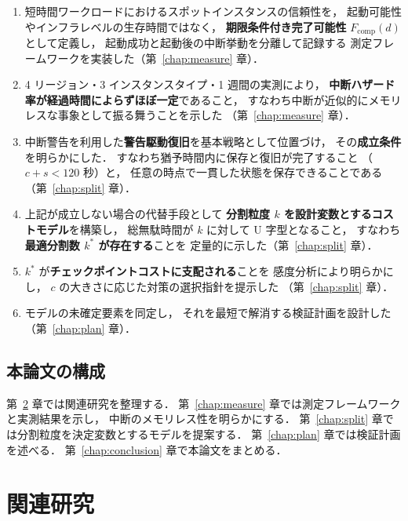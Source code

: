\documentclass[11pt,a4paper]{ltjsreport}
\newcommand{\Fcomp}{F_{\mathrm{comp}}}
\begin{document}
\begin{enumerate}
  \item 短時間ワークロードにおけるスポットインスタンスの信頼性を，
        起動可能性やインフラレベルの生存時間ではなく，
        \textbf{期限条件付き完了可能性} $\Fcomp(d)$ として定義し，
        起動成功と起動後の中断挙動を分離して記録する
        測定フレームワークを実装した（第~\ref{chap:measure} 章）．
  \item 4 リージョン・3 インスタンスタイプ・1 週間の実測により，
        \textbf{中断ハザード率が経過時間によらずほぼ一定}であること，
        すなわち中断が近似的にメモリレスな事象として振る舞うことを示した
        （第~\ref{chap:measure} 章）．
  \item 中断警告を利用した\textbf{警告駆動復旧}を基本戦略として位置づけ，
        その\textbf{成立条件}を明らかにした．
        すなわち猶予時間内に保存と復旧が完了すること
        （$c + s < 120$ 秒）と，
        任意の時点で一貫した状態を保存できることである
        （第~\ref{chap:split} 章）．
  \item 上記が成立しない場合の代替手段として
        \textbf{分割粒度 $k$ を設計変数とするコストモデル}を構築し，
        総無駄時間が $k$ に対して U 字型となること，
        すなわち\textbf{最適分割数 $k^{*}$ が存在する}ことを
        定量的に示した（第~\ref{chap:split} 章）．
  \item $k^{*}$ が\textbf{チェックポイントコストに支配される}ことを
        感度分析により明らかにし，
        $c$ の大きさに応じた対策の選択指針を提示した
        （第~\ref{chap:split} 章）．
  \item モデルの未確定要素を同定し，
        それを最短で解消する検証計画を設計した
        （第~\ref{chap:plan} 章）．
\end{enumerate}

\section{本論文の構成}

第~\ref{chap:related} 章では関連研究を整理する．
第~\ref{chap:measure} 章では測定フレームワークと実測結果を示し，
中断のメモリレス性を明らかにする．
第~\ref{chap:split} 章では分割粒度を決定変数とするモデルを提案する．
第~\ref{chap:plan} 章では検証計画を述べる．
第~\ref{chap:conclusion} 章で本論文をまとめる．

\chapter{関連研究}
\label{chap:related}
\end{document}
